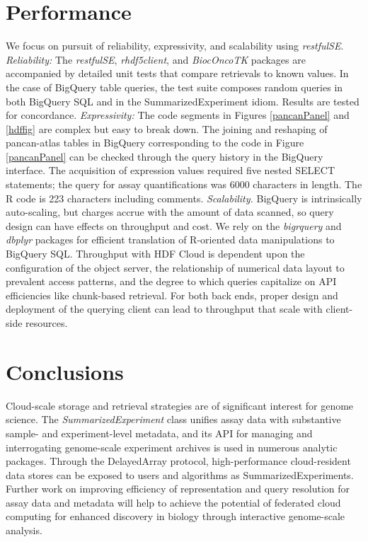 \documentclass[applications]{gen-bioinformatics}
\newcommand{\Rpackage}[1]{{\textit{#1}}}
\newcommand{\Rclass}[1]{{\textit{#1}}}
\begin{document}
\section*{Performance}

We focus on pursuit of reliability,
expressivity, and scalability using \Rpackage{restfulSE}.  
\textit{Reliability:} 
The \Rpackage{restfulSE}, \Rpackage{rhdf5client},
and \Rpackage{BiocOncoTK} packages are accompanied by detailed unit
tests that compare retrievals to known values.  In the
case of BigQuery table queries, the test
suite composes random queries 
in both BigQuery SQL and in the SummarizedExperiment idiom.  Results
are tested for concordance.  \textit{Expressivity:} The code
segments in Figures \ref{pancanPanel} and \ref{hdffig} are
complex but easy to break down.  The joining and
reshaping of pancan-atlas tables in BigQuery corresponding
to the code in Figure \ref{pancanPanel}
can be checked through the query history in the BigQuery
interface.  The acquisition of expression values required
five nested SELECT statements; the query for assay quantifications
was 6000 characters in length.
The R code is 223 characters including comments.
\textit{Scalability.}  BigQuery is intrinsically auto-scaling,
but charges accrue with the amount of data scanned, 
so query design can have effects on throughput
and cost.  We rely on the \Rpackage{bigrquery} and \Rpackage{dbplyr} packages for
efficient translation of R-oriented data manipulations to 
BigQuery SQL.  Throughput with HDF Cloud 
is dependent upon the configuration of the object server,
the relationship of numerical data layout to prevalent access
patterns, and the degree to which queries capitalize on
API efficiencies like chunk-based retrieval.  For both
back ends, proper design and deployment of the querying client can
lead to throughput that scale with client-side resources.

\section*{Conclusions}

Cloud-scale storage and retrieval strategies are of significant
interest for genome science.  The \Rclass{SummarizedExperiment} class
unifies assay data with substantive sample- and experiment-level
metadata, and its API for managing and interrogating
genome-scale experiment archives is used in numerous
analytic packages.  Through the DelayedArray protocol, high-performance
cloud-resident data stores can be exposed to users and
algorithms as SummarizedExperiments.  Further work on improving
efficiency of
representation and query resolution for assay data and metadata
will help to achieve the potential of federated cloud computing for
enhanced discovery in biology through interactive genome-scale analysis.
\end{document}

